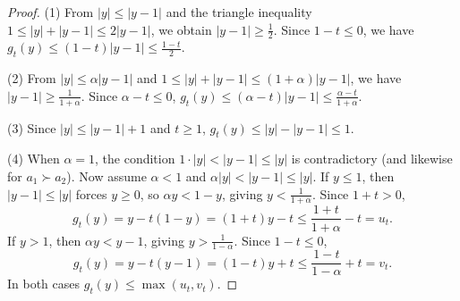\documentclass[11pt]{article}
\begin{document}
\begin{proof}
(1) From $|y| \le |y - 1|$ and the triangle inequality
$1 \le |y| + |y - 1| \le 2|y - 1|$, we obtain $|y - 1| \ge \frac{1}{2}$. Since
$1 - t \le 0$, we have $g_t(y) \le (1 - t)|y - 1| \le \frac{1 - t}{2}$.

(2) From $|y| \le \alpha|y - 1|$ and $1 \le |y| + |y - 1| \le (1 + \alpha)|y - 1|$,
we have $|y - 1| \ge \frac{1}{1 + \alpha}$. Since $\alpha - t \le 0$,
$g_t(y) \le (\alpha - t)|y - 1| \le \frac{\alpha - t}{1 + \alpha}$.

(3) Since $|y| \le |y - 1| + 1$ and $t \ge 1$,
$g_t(y) \le |y| - |y - 1| \le 1$.

(4) When $\alpha = 1$, the condition $1 \cdot |y| < |y - 1| \le |y|$ is
contradictory (and likewise for $a_1 \succ a_2$). Now assume $\alpha < 1$ and
$\alpha|y| < |y - 1| \le |y|$. If $y \le 1$, then $|y - 1| \le |y|$ forces
$y \ge 0$, so $\alpha y < 1 - y$, giving $y < \frac{1}{1 + \alpha}$. Since
$1 + t > 0$,
\[
g_t(y) = y - t(1 - y) = (1 + t)y - t \le \frac{1 + t}{1 + \alpha} - t = u_t.
\]
If $y > 1$, then $\alpha y < y - 1$, giving $y > \frac{1}{1 - \alpha}$. Since
$1 - t \le 0$,
\[
g_t(y) = y - t(y - 1) = (1 - t)y + t \le \frac{1 - t}{1 - \alpha} + t = v_t.
\]
In both cases $g_t(y) \le \max(u_t, v_t)$.
\end{proof}
\end{document}
